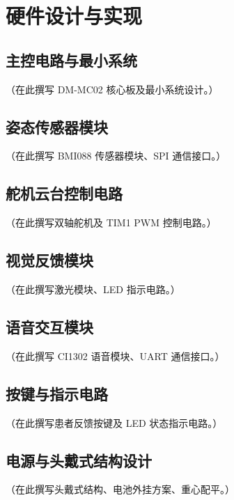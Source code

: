 \chapter{硬件设计与实现}

\section{主控电路与最小系统}
（在此撰写 DM-MC02 核心板及最小系统设计。）

\section{姿态传感器模块}
（在此撰写 BMI088 传感器模块、SPI 通信接口。）

\section{舵机云台控制电路}
（在此撰写双轴舵机及 TIM1 PWM 控制电路。）

\section{视觉反馈模块}
（在此撰写激光模块、LED 指示电路。）

\section{语音交互模块}
（在此撰写 CI1302 语音模块、UART 通信接口。）

\section{按键与指示电路}
（在此撰写患者反馈按键及 LED 状态指示电路。）

\section{电源与头戴式结构设计}
（在此撰写头戴式结构、电池外挂方案、重心配平。）
